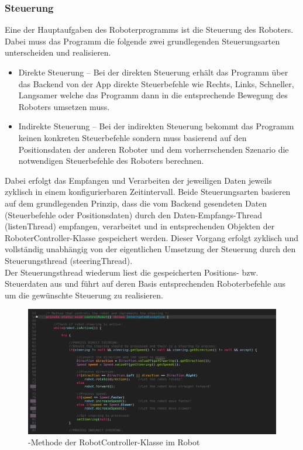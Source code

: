 \subsubsection{Steuerung}
Eine der Hauptaufgaben des Roboterprogramms ist die Steuerung des Roboters. Dabei muss das Programm die folgende zwei 
grundlegenden Steuerungsarten unterscheiden und realisieren.
\begin{itemize}
	\item{Direkte Steuerung} -- Bei der direkten Steuerung erhält das Programm über das Backend von der App direkte Steuerbefehle wie
	Rechts, Links, Schneller, Langsamer welche das Programm dann in die entsprechende Bewegung des Roboters umsetzen muss.
	\item{Indirekte Steuerung} -- Bei der indirekten Steuerung bekommt das Programm keinen konkreten Steuerbefehle sondern muss basierend
	auf den Positionsdaten der anderen Roboter und dem vorherrschenden Szenario die notwendigen Steuerbefehle des Roboters berechnen.
\end{itemize}
Dabei erfolgt das Empfangen und Verarbeiten der jeweiligen Daten jeweils zyklisch in einem konfigurierbaren Zeitintervall. Beide Steuerungsarten
basieren auf dem grundlegenden Prinzip, dass die vom Backend gesendeten Daten (Steuerbefehle oder Positionsdaten) durch den 
Daten-Empfangs-Thread (listenThread) empfangen, verarbeitet und in entsprechenden Objekten der RoboterController-Klasse gespeichert werden. 
Dieser Vorgang erfolgt zyklisch und vollständig unabhängig von der eigentlichen Umsetzung der Steuerung durch den Steuerungsthread (steeringThread). \\
Der Steuerungsthread wiederum liest die gespeicherten Positions- bzw. Steuerdaten aus und führt auf deren Basis entsprechenden Roboterbefehle 
aus um die gewünschte Steuerung zu realisieren.
\begin{figure}[ht]
	\centering
	\includegraphics[width=1.0\textwidth]{images/implementation/controlRobotMethod1.png}
	\caption[-Methode der RobotController-Klasse im Robot]{-Methode der RobotController-Klasse im Robot}
\end{figure}
